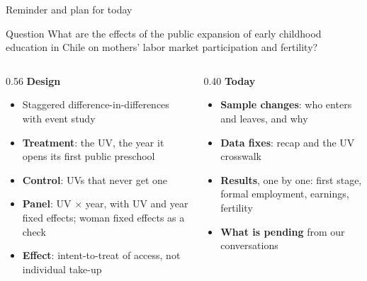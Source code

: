 \documentclass[aspectratio=169,10pt]{beamer}
\begin{document}
\begin{frame}{Reminder and plan for today}
\begin{block}{Question}
\small What are the effects of the public expansion of early childhood education in Chile on mothers' labor market participation and fertility?
\end{block}
\vspace{4pt}
\begin{columns}[T]
\begin{column}{0.56\textwidth}
{\small\textcolor{steel}{\textbf{Design}}}
\begin{itemize}
  \footnotesize
  \item Staggered difference-in-differences with event study
  \item \textbf{Treatment}: the UV, the year it opens its first public preschool
  \item \textbf{Control}: UVs that never get one
  \item \textbf{Panel}: UV $\times$ year, with UV and year fixed effects; woman fixed effects as a check
  \item \textbf{Effect}: intent-to-treat of access, not individual take-up
\end{itemize}
\end{column}
\begin{column}{0.40\textwidth}
{\small\textcolor{steel}{\textbf{Today}}}
\begin{itemize}
  \footnotesize
  \item \textbf{Sample changes}: who enters and leaves, and why
  \item \textbf{Data fixes}: recap and the UV crosswalk
  \item \textbf{Results}, one by one: first stage, formal employment, earnings, fertility
  \item \textbf{What is pending} from our conversations
\end{itemize}
\end{column}
\end{columns}
\end{frame}
\end{document}
